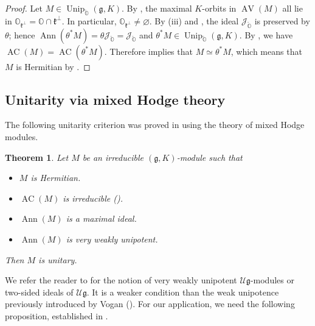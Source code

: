 \documentclass[11pt, a4paper]{amsart}
\newcommand{\J}{\mathcal{J}}
\newcommand{\g}{\mathfrak{g}}
\newcommand{\orb}{\mathbb{O}}
\newcommand{\fg}{\mathfrak{g}}
\newcommand{\fk}{\mathfrak{k}}
\newcommand{\ckorb}{\check{\orb}}
\newcommand{\cU}{\mathcal{U}}
\newcommand{\Ug}{\cU\fg}
\DeclareMathOperator{\AV}{AV}
\DeclareMathOperator{\AC}{AC}
\DeclareMathOperator{\Ann}{Ann}
\DeclareMathOperator{\Unip}{Unip}
\newcommand{\UnipOv}{\Unip_{\ckorb}}
\newtheorem{Thm}{Theorem}[subsection]
\theoremstyle{definition}
\numberwithin{equation}{section}
\begin{document}
\begin{proof}
	Let $M \in \UnipOv(\g, K)$. By , the maximal $K$-orbits in $\AV(M)$ all lie in $\orb_{\fk^\perp} = \orb \cap \fk^\perp$. In particular, $\orb_{\fk^\perp} \neq \varnothing$.
	By  (iii) and , the ideal $\J_{\ckorb}$ is preserved by $\theta$; hence $\Ann(\theta^*M) = \theta \J_{\ckorb} = \J_{\ckorb}$ and $\theta^*M \in \UnipOv(\g, K)$. By , we have $\AC(M) = \AC(\theta^*M)$. Therefore  implies that $M \simeq \theta^*M$, which means that $M$ is Hermitian by .
\end{proof}


\subsection{Unitarity via mixed Hodge theory}

The following unitarity criterion was proved in \cite[Theorem 5.22]{DMB-Hodge} using the theory of mixed Hodge modules.

\begin{Thm}\label{thm:unitarity_criterion}
	Let $M$ be an irreducible $(\fg,K)$-module such that
	\begin{itemize}
		\item[(i)] $M$ is Hermitian.
		\item[(ii)] $\AC(M)$ is irreducible ().
		\item[(iii)] $\Ann(M)$ is a maximal ideal.
		\item[(iv)] $\Ann(M)$ is very weakly unipotent.
	\end{itemize}
	Then $M$ is unitary.
\end{Thm}

We refer the reader to \cite[Definition 4.11]{DMB-Hodge} for the notion of very weakly unipotent $\Ug$-modules or two-sided ideals of $\Ug$. It is a weaker condition than the weak unipotence previously introduced by Vogan (\cite[Definition 8.16]{Vogan:unitarizability}). For our application, we need the following proposition, established in \cite[Theorem 2.19, Theorem 3.16]{MaYu:weak_unipotence}.  
\end{document}
